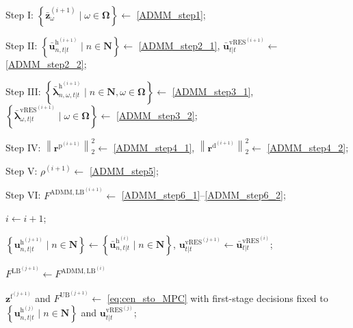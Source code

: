 \documentclass[a4paper,fleqn]{cas-sc}
\begin{document}
\begin{algorithm}[t]
\begin{algorithmic}[1]

\State Step I:
$\left\{\boldsymbol{\bar{z}}^{(i+1)}_\omega \;\Big|\; \omega \in \boldsymbol{\Omega}\right\}\gets$ \eqref{ADMM_step1};

\State Step II:
$\left\{\boldsymbol{\bar{u}}^{\boldsymbol{\mathrm{h}}^{(i+1)}}_{n,t|t} \;\Big|\; n \in \boldsymbol{N}\right\} \gets$ \eqref{ADMM_step2_1},
$\boldsymbol{\bar{u}}^{\boldsymbol{\mathrm{vRES}}^{(i+1)}}_{t|t} \gets$ \eqref{ADMM_step2_2};

\State Step III:
$\left\{\boldsymbol{\bar{\lambda}}^{\boldsymbol{\mathrm{h}}^{(i+1)}}_{n,\omega,t|t} \;\Big|\; n \in \boldsymbol{N}, \omega \in \boldsymbol{\Omega}\right\} \gets$ \eqref{ADMM_step3_1},
$\left\{\boldsymbol{\bar{\lambda}}^{\boldsymbol{\mathrm{vRES}}^{(i+1)}}_{\omega,t|t} \;\Big|\; \omega \in \boldsymbol{\Omega}\right\} \gets$ \eqref{ADMM_step3_2};

\State Step IV:
$\left\|\boldsymbol{r}^{\boldsymbol{\mathrm{p}}^{(i+1)}}\right\|_2^2 \gets$ \eqref{ADMM_step4_1},
$\left\|\boldsymbol{r}^{\boldsymbol{\mathrm{d}}^{(i+1)}}\right\|_2^2 \gets$ \eqref{ADMM_step4_2};

\State Step V:
$\rho^{(i+1)} \gets $ \eqref{ADMM_step5};

\State Step VI:
$F^{{\mathrm{ADMM,LB}}^{(i+1)}} \gets$ \eqref{ADMM_step6_1}--\eqref{ADMM_step6_2};

\State $i \gets i+1$;

\EndWhile

\vspace{0.1cm}
\State $\left\{\boldsymbol{u}^{\boldsymbol{\mathrm{h}}^{(j+1)}}_{n,t|t} \;\Big|\; n \in \boldsymbol{N}\right\}
\gets
\left\{\boldsymbol{\bar{u}}^{\boldsymbol{\mathrm{h}}^{(i)}}_{n,t|t} \;\Big|\; n \in \boldsymbol{N}\right\}$,
$\boldsymbol{u}^{\boldsymbol{\mathrm{vRES}}^{(j+1)}}_{t|t}
\gets
\boldsymbol{\bar{u}}^{\boldsymbol{\mathrm{vRES}}^{(i)}}_{t|t}$;

\State  $F^{{\mathrm{LB}}^{(j+1)}} \gets F^{{\mathrm{ADMM,LB}}^{(i)}}$

\State $\boldsymbol{z}^{\boldsymbol{{\mathrm{f}}}^{(j+1)}}$ and $F^{{\mathrm{UB}}^{(j+1)}} \gets$ \eqref{eq:cen_sto_MPC} with first-stage decisions fixed to
$\left\{\boldsymbol{u}^{\boldsymbol{\mathrm{h}}^{(j)}}_{n,t|t} \;\Big|\; n \in \boldsymbol{N}\right\}$
and
$\boldsymbol{u}^{\boldsymbol{\mathrm{vRES}}^{(j)}}_{t|t}$;


\end{algorithmic}
\end{algorithm}
\end{document}
